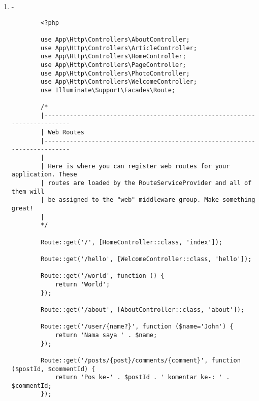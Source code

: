 \documentclass[12pt,titlepage]{article}
\begin{document}
\begin{enumerate}[label=\alph*.]
\begin{verbatim}
        GET|HEAD        posts/{post}/comments/{comment} ...... ...... ...... ...... ...... ...... ...... ...... ...... .. ...... ...... ...... ...... ...... ...... ...... ...... ...... ....  
        GET|HEAD        sanctum/csrf-cookie ...... ...... ...... ...... ...... ...... ...... ...... ......  ......  sanctum.csrf-cookie > Laravel\Sanctum > CsrfCookieController@show  
        GET|HEAD        user/{name?} ...... ...... ...... ...... ...... ...... ...... ...... ...... .... ...... ...... ...... ...... ...... ...... ...... ...... ...... ...... ..... ...... ....  
        GET|HEAD        world ...... ...... ...... ...... ...... ...... ...... ...... ...... ......  ...... ...... ...... ...... ...... ...... ...... ...... ...... ...... ..... ...... ...... ...
        Showing [19] routes
    \end{verbatim}
    \item -
    \begin{verbatim}
        <?php

        use App\Http\Controllers\AboutController;
        use App\Http\Controllers\ArticleController;
        use App\Http\Controllers\HomeController;
        use App\Http\Controllers\PageController;
        use App\Http\Controllers\PhotoController;
        use App\Http\Controllers\WelcomeController;
        use Illuminate\Support\Facades\Route;
        
        /*
        |--------------------------------------------------------------------------
        | Web Routes
        |--------------------------------------------------------------------------
        |
        | Here is where you can register web routes for your application. These
        | routes are loaded by the RouteServiceProvider and all of them will
        | be assigned to the "web" middleware group. Make something great!
        |
        */
        
        Route::get('/', [HomeController::class, 'index']);
        
        Route::get('/hello', [WelcomeController::class, 'hello']);
        
        Route::get('/world', function () {
            return 'World';
        }); 
        
        Route::get('/about', [AboutController::class, 'about']); 
        
        Route::get('/user/{name?}', function ($name='John') {
            return 'Nama saya ' . $name;
        }); 
        
        Route::get('/posts/{post}/comments/{comment}', function ($postId, $commentId) {
            return 'Pos ke-' . $postId . ' komentar ke-: ' . $commentId;
        });
        

\end{verbatim}
\end{enumerate}
\end{document}
